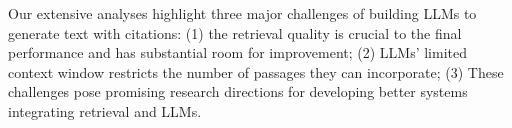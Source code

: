 Our extensive analyses  
highlight three major challenges of building LLMs to generate text with citations: 
(1) 
the retrieval quality is crucial to the final performance and  has substantial room for improvement;
(2) 
LLMs' limited context window
restricts the number of passages they can incorporate;
(3) 
These challenges pose promising research directions for 
developing better systems integrating retrieval and LLMs.

















